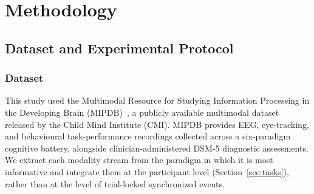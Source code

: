 \section{Methodology}
\label{method}
\subsection{Dataset and Experimental Protocol}
\subsubsection{Dataset}
This study used the Multimodal Resource for Studying Information Processing in the
Developing Brain (MIPDB)~\cite{Langer2017}, a publicly available multimodal dataset
released by the Child Mind Institute (CMI). MIPDB provides EEG, eye-tracking, and
behavioural task-performance recordings collected across a six-paradigm cognitive
battery, alongside clinician-administered DSM-5 diagnostic assessments. We extract
each modality stream from the paradigm in which it is most informative and integrate
them at the participant level (Section~\ref{sec:tasks}), rather than at the level of
trial-locked synchronized events.

